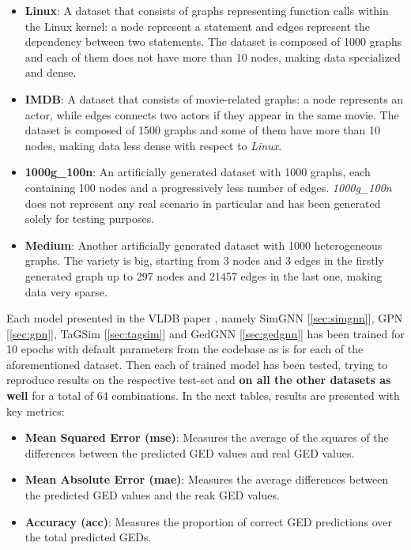 \documentclass[../Thesis.tex]{subfiles}
\begin{document}
	\begin{itemize}
		\item \textbf{Linux}: A dataset that consists of graphs representing function calls within the Linux kernel: a node represent a statement and edges represent the dependency between two statements. The dataset is composed of 1000 graphs and each of them does not have more than 10 nodes, making data specialized and dense.
		\item \textbf{IMDB}: A dataset that consists of movie-related graphs: a node represents an actor, while edges connects two actors if they appear in the same movie. The dataset is composed of 1500 graphs and some of them have more than 10 nodes, making data less dense with respect to \emph{Linux}.
		\item \textbf{1000g\_100n}: An artificially generated dataset with 1000 graphs, each containing 100 nodes and a progressively less number of edges. \emph{1000g\_100n} does not represent any real scenario in particular and has been generated solely for testing purposes.
		\item \textbf{Medium}: Another artificially generated dataset with 1000 heterogeneous graphs. The variety is big, starting from 3 nodes and 3 edges in the firstly generated graph up to 297 nodes and 21457 edges in the last one, making data very sparse.
	\end{itemize}
	
	Each model presented in the VLDB paper \cite{computing_graph_edit_distance_via_neural_graph_matching}, namely SimGNN [\autoref{sec:simgnn}], GPN [\autoref{sec:gpn}], TaGSim [\autoref{sec:tagsim}] and GedGNN [\autoref{sec:gedgnn}] has been trained for 10 epochs with default parameters from the codebase as is for each of the aforementioned dataset. Then each of trained model has been tested, trying to reproduce \cite{computing_graph_edit_distance_via_neural_graph_matching} results on the respective test-set and \textbf{on all the other datasets as well} for a total of 64 combinations. In the next tables, results are presented with key metrics: 
	\begin{itemize}
		\item \textbf{Mean Squared Error (mse)}: Measures the average of the squares of the differences between the predicted GED values and real GED values.
		\item \textbf{Mean Absolute Error (mae)}: Measures the average differences between the predicted GED values and the reak GED values.
		\item \textbf{Accuracy (acc)}: Measures the proportion of correct GED predictions over the total predicted GEDs.
	\end{itemize}
	
\end{document}
